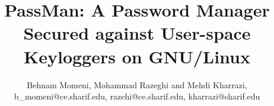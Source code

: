 \title{PassMan: A Password Manager Secured against User-space Keyloggers on GNU/Linux}

\author{Behnam Momeni, Mohammad Razeghi and Mehdi Kharrazi,

 b\_momeni@ce.sharif.edu, razehi@ce.sharif.edu, kharrazi@sharif.edu}


\maketitle